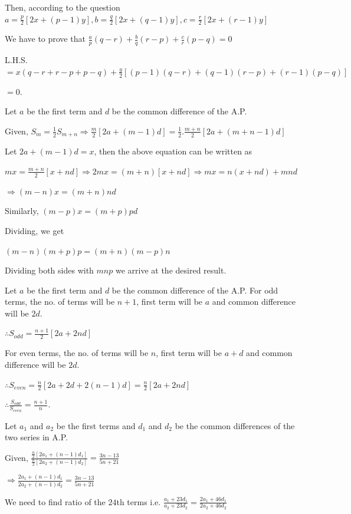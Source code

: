   Then, according to the question $a = \frac{p}{2}[2x + (p - 1)y], b = \frac{q}{2}[2x + (q - 1)y], c = \frac{r}{2}[2x + (r - 1)y]$

  We have to prove that $\frac{a}{p}(q - r) + \frac{b}{q}(r - p) + \frac{c}{r}(p - q) = 0$

  L.H.S. $= x(q - r + r - p + p - q) + \frac{y}{2}[(p - 1)(q - r) + (q - 1)(r - p) + (r - 1)(p - q)]$

  $= 0$.
\item Let $a$ be the first term and $d$ be the common difference of the A.P.

  Given, $S_m = \frac{1}{2}S_{m + n}\Rightarrow \frac{m}{2}[2a + (m - 1)d] = \frac{1}{2}.\frac{m + n}{2}[2a + (m + n - 1)d]$

  Let $2a + (m - 1)d = x$, then the above equation can be written as

  $mx = \frac{m + n}{2}[x + nd] \Rightarrow 2mx = (m + n)[x + nd]\Rightarrow mx = n(x + nd) + mnd$

  $\Rightarrow (m - n)x = (m + n)nd$

  Similarly, $(m - p)x = (m + p)pd$

  Dividing, we get

  $(m - n)(m + p)p = (m + n)(m - p)n$

  Dividing both sides with $mnp$ we arrive at the desired result.
\item Let $a$ be the first term and $d$ be the common difference of the A.P. For odd terms, the no. of terms will be $n + 1$, first
  term will be $a$ and common difference will be $2d$.

  $\therefore S_{odd} = \frac{n + 1}{2}[2a + 2nd]$

  For even terms, the no. of terms will be $n$, first term will be $a + d$ and common difference will be $2d$.

  $\therefore S_{even} = \frac{n}{2}[2a + 2d + 2(n - 1)d] = \frac{n}{2}[2a + 2nd]$

  $\therefore \frac{S_{odd}}{S_{even}} = \frac{n + 1}{n}$.
\item Let $a_1$ and $a_2$ be the first terms and $d_1$ and $d_2$ be the common differences of the two series in A.P.

  Given, $\frac{\tfrac{n}{2}[2a_1 + (n - 1)d_1]}{\tfrac{n}{2}[2a_2 + (n - 1)d_2]} = \frac{3n - 13}{5n + 21}$

  $\Rightarrow \frac{2a_1 + (n - 1)d_1}{2a_2 + (n - 1)d_2} = \frac{3n - 13}{5n + 21}$

  We need to find ratio of the $24$th terms i.e. $\frac{a_1 + 23d_1}{a_2 + 23d_2} = \frac{2a_1 + 46d_1}{2a_2 + 46d_2}$

